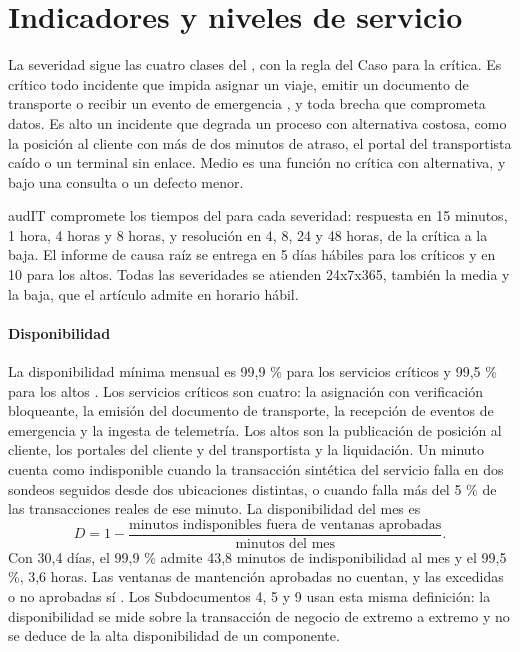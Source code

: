 \section{Indicadores y niveles de servicio}\label{sec:10-indicadores-y-niveles-de-servici}

La severidad sigue las cuatro clases del , con la regla del Caso para la crítica. Es
crítico todo incidente que impida asignar un viaje, emitir un documento de transporte o recibir un
evento de emergencia , y toda brecha que comprometa datos. Es alto un incidente que
degrada un proceso con alternativa costosa, como la posición al cliente con más de dos minutos de
atraso, el portal del transportista caído o un terminal sin enlace. Medio es una función no crítica con
alternativa, y bajo una consulta o un defecto menor.

audIT compromete los tiempos del  para cada severidad: respuesta en 15 minutos, 1 hora, 4
horas y 8 horas, y resolución en 4, 8, 24 y 48 horas, de la crítica a la baja. El informe de causa raíz
se entrega en 5 días hábiles para los críticos y en 10 para los altos. Todas las severidades se
atienden 24x7x365, también la media y la baja, que el artículo admite en horario hábil.

\paragraph{Disponibilidad} La disponibilidad mínima mensual es 99,9 \% para los servicios críticos y
99,5 \% para los altos . Los servicios críticos son cuatro: la asignación con
verificación bloqueante, la emisión del documento de transporte, la recepción de eventos de emergencia y
la ingesta de telemetría. Los altos son la publicación de posición al cliente, los portales del cliente
y del transportista y la liquidación. Un minuto cuenta como indisponible cuando la transacción sintética
del servicio falla en dos sondeos seguidos desde dos ubicaciones distintas, o cuando falla más del 5 \%
de las transacciones reales de ese minuto. La disponibilidad del mes es
\[
D = 1 - \frac{\text{minutos indisponibles fuera de ventanas aprobadas}}{\text{minutos del mes}} .
\]
Con 30,4 días, el 99,9 \% admite 43,8 minutos de indisponibilidad al mes y el 99,5 \%, 3,6 horas. Las
ventanas de mantención aprobadas no cuentan, y las excedidas o no aprobadas sí . Los
Subdocumentos 4, 5 y 9 usan esta misma definición: la disponibilidad se mide sobre la transacción de
negocio de extremo a extremo y no se deduce de la alta disponibilidad de un componente.

